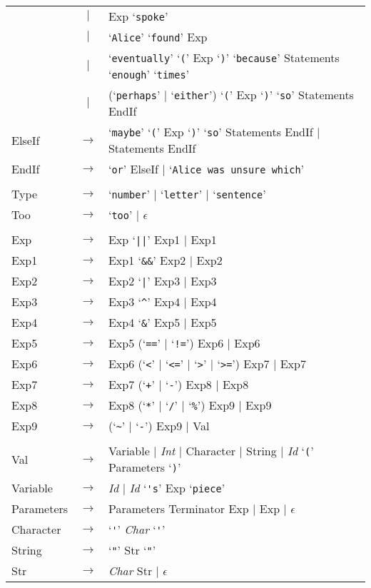 \documentclass[a4paper,11pt]{article}
\begin{document}
\begin{tabular}{lcl}
            &  $|$  & Exp `\verb|spoke|' \\
            &  $|$  & `\verb:Alice:' `\verb:found:' Exp \\
            &  $|$  & `\verb|eventually|' `\verb|(|' Exp `\verb|)|' `\verb|because|' Statements `\verb|enough|' `\verb|times|' \\
            &  $|$  & (`\verb|perhaps|' $|$ `\verb|either|') `\verb|(|' Exp `\verb|)|' `\verb|so|' Statements EndIf \\
ElseIf      & $\to$ & `\verb|maybe|' `\verb|(|' Exp `\verb|)|' `\verb|so|' Statements EndIf $|$ Statements EndIf \\
EndIf       & $\to$ & `\verb|or|' ElseIf $|$ `\verb|Alice was unsure which|' \\
\\
Type        & $\to$ & `\verb|number|' $|$ `\verb|letter|' $|$ `\verb|sentence|' \\
Too         & $\to$ & `\verb|too|' $|$ $\epsilon$ \\
\\
Exp         & $\to$ & Exp `\verb:||:' Exp1 $|$ Exp1 \\
Exp1        & $\to$ & Exp1 `\verb:&&:' Exp2 $|$ Exp2 \\
Exp2        & $\to$ & Exp2 `\verb:|:' Exp3 $|$ Exp3 \\
Exp3        & $\to$ & Exp3 `\verb:^:' Exp4 $|$ Exp4 \\
Exp4        & $\to$ & Exp4 `\verb:&:' Exp5 $|$ Exp5 \\
Exp5        & $\to$ & Exp5 (`\verb:==:' $|$ `\verb:!=:') Exp6 $|$ Exp6 \\
Exp6        & $\to$ & Exp6 (`\verb:<:' $|$ `\verb:<=:' $|$ `\verb:>:' $|$ `\verb:>=:') Exp7 $|$ Exp7 \\
Exp7        & $\to$ & Exp7 (`\verb:+:' $|$ `\verb:-:') Exp8 $|$ Exp8 \\
Exp8        & $\to$ & Exp8 (`\verb:*:' $|$ `\verb:/:' $|$ `\verb:%:') Exp9 $|$ Exp9 \\
Exp9        & $\to$ & (`\verb:~:' $|$ `\verb:-:') Exp9 $|$ Val \\
\\
Val         & $\to$ & Variable $|$ \emph{Int} $|$ Character $|$ String $|$ \emph{Id} `\verb|(|' Parameters `\verb|)|' \\
Variable    & $\to$ & \emph{Id} $|$ \emph{Id} `\verb|'s|' Exp `\verb|piece|' \\
Parameters  & $\to$ & Parameters Terminator Exp $|$ Exp $|$ $\epsilon$ \\
Character   & $\to$ & `\verb|'|' \emph{Char} `\verb|'|' \\
String      & $\to$ & `\verb|"|' Str `\verb|"|' \\
Str         & $\to$ & \emph{Char} Str $|$ $\epsilon$ 
\end{tabular}
\end{document}
